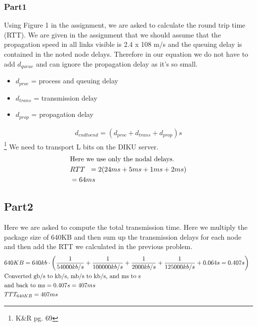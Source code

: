 \documentclass[12pt,a4paper]{article}
\begin{document}
\subsubsection*{Part1}
Using Figure 1 in the assignment, we are asked to calculate the round trip time (RTT). We are given in the assignment that we should assume that the propagation speed in all links visible is 2.4 x 108 m/s and the queuing delay is contained in the noted node delays. Therefore in our equation we do not have to add $d_{queue}$ and can ignore the propagation delay as it's so small.
\\
\begin{itemize}
\item$d_{proc}$ = process and queuing delay\\
\item$d_{trans}$ = transmission delay\\
\item$d_{prop}$ = propagation delay
\end{itemize}

\begin{align*}
d_{end to end} = (d_{proc} + d_{trans} + d_{prop})s
\end{align*}\footnote{K\&R pg. 69}
We need to transport L bits on the DIKU server. 
\begin{equation}
\begin{split}
& \text{Here we use only the nodal delays.}\\
& RTT \hspace{0.2cm} = 2(24ms+5ms+1ms+2ms)\\
& = 64ms
\end{split}
\end{equation}


\subsection*{Part2}
Here we are asked to compute the total transmission time. Here we multiply the package size of 640KB and then sum up the transmission delays for each node and then add the RTT we calculated in the previous problem. 
\begin{equation}
\begin{split}
& 640KB = 640kb\cdot \left( \frac{1}{54000kb/s} + \frac{1}{100000kb/s} + \frac{1}{2000kb/s} + \frac{1}{125000kb/s} + 0.064s = 0.407 s \right) \hspace{0.2cm}\\
& \text{Converted gb/s to kb/s, mb/s to kb/s, and ms to s}\\
& \text{and back to ms} = 0.407s = 407ms\\
& TTT_{640KB} = 407ms
\end{split}
\end{equation}
\end{document}
